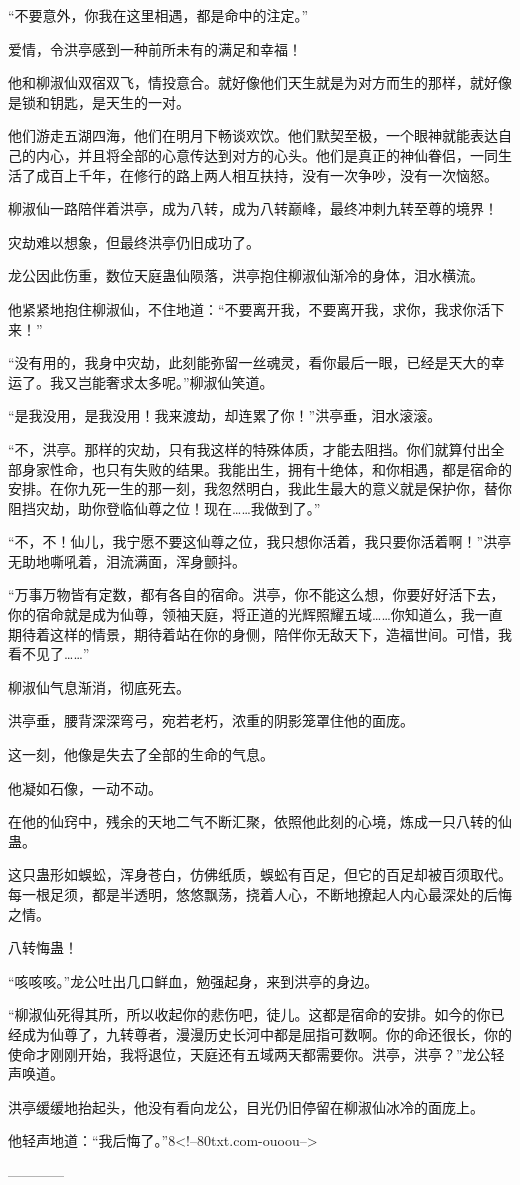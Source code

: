 \begin{this_body}
“不要意外，你我在这里相遇，都是命中的注定。”

爱情，令洪亭感到一种前所未有的满足和幸福！

他和柳淑仙双宿双飞，情投意合。就好像他们天生就是为对方而生的那样，就好像是锁和钥匙，是天生的一对。

他们游走五湖四海，他们在明月下畅谈欢饮。他们默契至极，一个眼神就能表达自己的内心，并且将全部的心意传达到对方的心头。他们是真正的神仙眷侣，一同生活了成百上千年，在修行的路上两人相互扶持，没有一次争吵，没有一次恼怒。

柳淑仙一路陪伴着洪亭，成为八转，成为八转巅峰，最终冲刺九转至尊的境界！

灾劫难以想象，但最终洪亭仍旧成功了。

龙公因此伤重，数位天庭蛊仙陨落，洪亭抱住柳淑仙渐冷的身体，泪水横流。

他紧紧地抱住柳淑仙，不住地道：“不要离开我，不要离开我，求你，我求你活下来！”

“没有用的，我身中灾劫，此刻能弥留一丝魂灵，看你最后一眼，已经是天大的幸运了。我又岂能奢求太多呢。”柳淑仙笑道。

“是我没用，是我没用！我来渡劫，却连累了你！”洪亭垂，泪水滚滚。

“不，洪亭。那样的灾劫，只有我这样的特殊体质，才能去阻挡。你们就算付出全部身家性命，也只有失败的结果。我能出生，拥有十绝体，和你相遇，都是宿命的安排。在你九死一生的那一刻，我忽然明白，我此生最大的意义就是保护你，替你阻挡灾劫，助你登临仙尊之位！现在……我做到了。”

“不，不！仙儿，我宁愿不要这仙尊之位，我只想你活着，我只要你活着啊！”洪亭无助地嘶吼着，泪流满面，浑身颤抖。

“万事万物皆有定数，都有各自的宿命。洪亭，你不能这么想，你要好好活下去，你的宿命就是成为仙尊，领袖天庭，将正道的光辉照耀五域……你知道么，我一直期待着这样的情景，期待着站在你的身侧，陪伴你无敌天下，造福世间。可惜，我看不见了……”

柳淑仙气息渐消，彻底死去。

洪亭垂，腰背深深弯弓，宛若老朽，浓重的阴影笼罩住他的面庞。

这一刻，他像是失去了全部的生命的气息。

他凝如石像，一动不动。

在他的仙窍中，残余的天地二气不断汇聚，依照他此刻的心境，炼成一只八转的仙蛊。

这只蛊形如蜈蚣，浑身苍白，仿佛纸质，蜈蚣有百足，但它的百足却被百须取代。每一根足须，都是半透明，悠悠飘荡，挠着人心，不断地撩起人内心最深处的后悔之情。

八转悔蛊！

“咳咳咳。”龙公吐出几口鲜血，勉强起身，来到洪亭的身边。

“柳淑仙死得其所，所以收起你的悲伤吧，徒儿。这都是宿命的安排。如今的你已经成为仙尊了，九转尊者，漫漫历史长河中都是屈指可数啊。你的命还很长，你的使命才刚刚开始，我将退位，天庭还有五域两天都需要你。洪亭，洪亭？”龙公轻声唤道。

洪亭缓缓地抬起头，他没有看向龙公，目光仍旧停留在柳淑仙冰冷的面庞上。

他轻声地道：“我后悔了。”8<!--80txt.com-ouoou-->

------------

\end{this_body}


